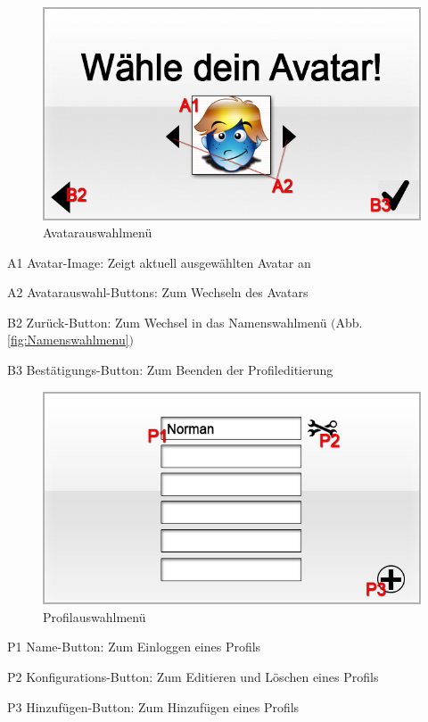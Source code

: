
\begin{figure}[H]
\centering
\includegraphics[scale=0.55]{../gui/_jpeg_numeration/registration3.jpg}
\caption{Avatarauswahlmenü}
\label{fig:Avatarauswahlmenu}
\end{figure}
\begin{description*}
\item[A1] Avatar-Image: Zeigt aktuell ausgewählten Avatar an
\item[A2] Avatarauswahl-Buttons: Zum Wechseln des Avatars
\item[B2] Zurück-Button: Zum Wechsel in das Namenswahlmenü $($Abb. \ref{fig:Namenswahlmenu}$)$
\item[B3] Bestätigungs-Button: Zum Beenden der Profileditierung
\end{description*}


\begin{figure}[H]
\centering
\includegraphics[scale=0.55]{../gui/_jpeg_numeration/choose_profile.jpg}
\caption{Profilauswahlmenü}
\label{fig:Profilauswahlmenu}
\end{figure}
\begin{description*}
\item[P1] Name-Button: Zum Einloggen eines Profils
\item[P2] Konfigurations-Button: Zum Editieren und Löschen eines Profils
\item[P3] Hinzufügen-Button: Zum Hinzufügen eines Profils
\end{description*}

